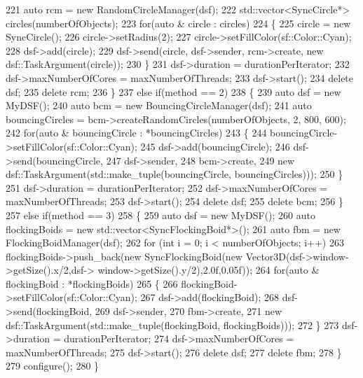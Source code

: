 \begin{DoxyCodeInclude}
221         \textcolor{keyword}{auto} rcm = \textcolor{keyword}{new} RandomCircleManager(dsf);
222         std::vector<SyncCircle*> circles(numberOfObjects);
223         \textcolor{keywordflow}{for}(\textcolor{keyword}{auto} & circle : circles)
224         \{
225             circle = \textcolor{keyword}{new} SyncCircle();
226             circle->setRadius(2);
227             circle->setFillColor(sf::Color::Cyan);
228             dsf->add(circle);
229             dsf->send(circle, dsf->sender, rcm->create, \textcolor{keyword}{new} dsf::TaskArgument(circle));
230         \}
231         dsf->duration = durationPerIterator;
232         dsf->maxNumberOfCores = maxNumberOfThreads;
233         dsf->start();
234         \textcolor{keyword}{delete} dsf;
235         \textcolor{keyword}{delete} rcm;
236     \}
237     \textcolor{keywordflow}{else} \textcolor{keywordflow}{if}(method == 2)
238     \{
239         \textcolor{keyword}{auto} dsf = \textcolor{keyword}{new} MyDSF();
240         \textcolor{keyword}{auto} bcm = \textcolor{keyword}{new} BouncingCircleManager(dsf);
241         \textcolor{keyword}{auto} bouncingCircles = bcm->createRandomCircles(numberOfObjects, 2, 800, 600);
242         \textcolor{keywordflow}{for}(\textcolor{keyword}{auto} & bouncingCircle : *bouncingCircles)
243         \{
244             bouncingCircle->setFillColor(sf::Color::Cyan);
245             dsf->add(bouncingCircle);
246             dsf->send(bouncingCircle,
247                       dsf->sender,
248                       bcm->create,
249                       \textcolor{keyword}{new} dsf::TaskArgument(std::make\_tuple(bouncingCircle, bouncingCircles)));
250         \}
251         dsf->duration = durationPerIterator;
252         dsf->maxNumberOfCores = maxNumberOfThreads;
253         dsf->start();
254         \textcolor{keyword}{delete} dsf;
255         \textcolor{keyword}{delete} bcm;
256     \}
257     \textcolor{keywordflow}{else} \textcolor{keywordflow}{if}(method == 3)
258     \{
259         \textcolor{keyword}{auto} dsf = \textcolor{keyword}{new} MyDSF();
260         \textcolor{keyword}{auto} flockingBoids = \textcolor{keyword}{new} std::vector<SyncFlockingBoid*>();
261         \textcolor{keyword}{auto} fbm = \textcolor{keyword}{new} FlockingBoidManager(dsf);
262         \textcolor{keywordflow}{for} (\textcolor{keywordtype}{int} i = 0; i < numberOfObjects; i++)
263             flockingBoids->push\_back(\textcolor{keyword}{new} SyncFlockingBoid(\textcolor{keyword}{new} Vector3D(dsf->window->getSize().x/2,dsf->
      window->getSize().y/2),2.0f,0.05f));
264         \textcolor{keywordflow}{for}(\textcolor{keyword}{auto} & flockingBoid : *flockingBoids)
265         \{
266             flockingBoid->setFillColor(sf::Color::Cyan);
267             dsf->add(flockingBoid);
268             dsf->send(flockingBoid,
269                       dsf->sender,
270                       fbm->create,
271                       \textcolor{keyword}{new} dsf::TaskArgument(std::make\_tuple(flockingBoid, flockingBoids)));
272         \}
273         dsf->duration = durationPerIterator;
274         dsf->maxNumberOfCores = maxNumberOfThreads;
275         dsf->start();
276         \textcolor{keyword}{delete} dsf;
277         \textcolor{keyword}{delete} fbm;
278     \}
279     configure();
280 \}
\end{DoxyCodeInclude}
 